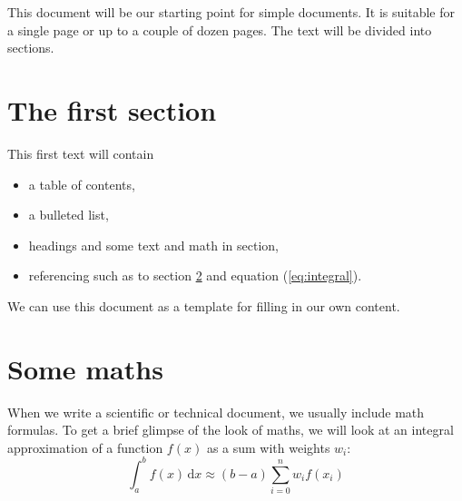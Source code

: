 \documentclass[paper=a4,oneside,fontsize=12pt,parskip=full]{scrartcl}
\begin{document}
\tableofcontents
{}
This document will be our starting point for simple documents. It
is suitable for a single page or up to a couple of dozen pages.
The text will be divided into sections.
\section{The first section}
This first text will contain
\begin{itemize}
\item a table of contents,
\item a bulleted list,
\item headings and some text and math in section,
\item referencing such as to section \ref{sec:maths} and
equation (\ref{eq:integral}).
\end{itemize}
We can use this document as a template for filling in our own
content.
\section{Some maths}
\label{sec:maths}
When we write a scientific or technical document, we
usually include math formulas. To get a brief glimpse
of the look of maths, we will look at an integral
approximation of a function \( f(x) \) as a sum with
weights \( w_i \):
\begin{equation}
\label{eq:integral}
\int_a^b f(x)\,\mathrm{d}x \approx (b-a)
\sum_{i=0}^n w_i f(x_i)
\end{equation}
\end{document}
